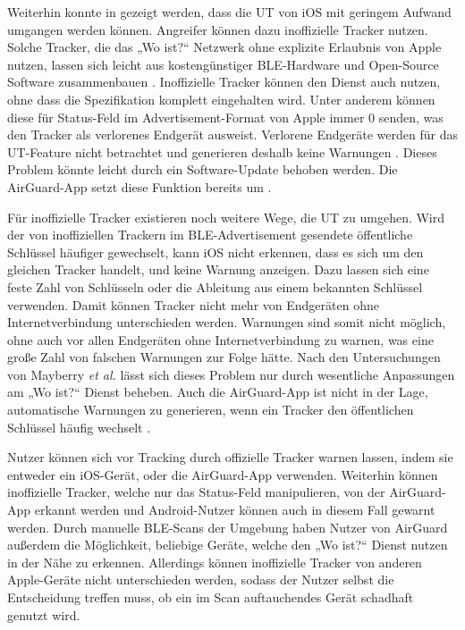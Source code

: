 Weiterhin konnte in \cite{Heinrich_AirGuard,Mayberry_Tracking} gezeigt werden, dass die \ac{UT} von iOS mit geringem Aufwand umgangen werden können.
Angreifer können dazu inoffizielle Tracker nutzen.
Solche Tracker, die das „Wo ist?“ Netzwerk ohne explizite Erlaubnis von Apple nutzen, lassen sich leicht aus kostengünstiger \ac{BLE}-Hardware und Open-Source Software zusammenbauen \cite{Heinrich_OpenHaystack,Mayberry_Tracking}.
Inoffizielle Tracker können den Dienst auch nutzen, ohne dass die Spezifikation komplett eingehalten wird.
Unter anderem können diese für Status-Feld im Advertisement-Format von Apple immer 0 senden, was den Tracker als verlorenes Endgerät ausweist.
Verlorene Endgeräte werden für das \ac{UT}-Feature nicht betrachtet und generieren deshalb keine Warnungen \cite{Heinrich_AirGuard,Mayberry_Tracking}.
Dieses Problem könnte leicht durch ein Software-Update behoben werden.
Die AirGuard-App setzt diese Funktion bereits um \cite{Heinrich_AirGuard}.

Für inoffizielle Tracker existieren noch weitere Wege, die \ac{UT} zu umgehen.
Wird der von inoffiziellen Trackern im \ac{BLE}-Advertisement gesendete öffentliche Schlüssel häufiger gewechselt, kann iOS nicht erkennen, dass es sich um den gleichen Tracker handelt, und keine Warnung anzeigen.
Dazu lassen sich eine feste Zahl von Schlüsseln oder die Ableitung aus einem bekannten Schlüssel verwenden.
Damit können Tracker nicht mehr von Endgeräten ohne Internetverbindung unterschieden werden.
Warnungen sind somit nicht möglich, ohne auch vor allen Endgeräten ohne Internetverbindung zu warnen, was eine große Zahl von falschen Warnungen zur Folge hätte.
Nach den Untersuchungen von Mayberry \textit{et al.} \cite{Mayberry_Tracking} lässt sich dieses Problem nur durch wesentliche Anpassungen am „Wo ist?“ Dienst beheben.
Auch die AirGuard-App ist nicht in der Lage, automatische Warnungen zu generieren, wenn ein Tracker den öffentlichen Schlüssel häufig wechselt \cite{Heinrich_AirGuard}.

Nutzer können sich vor Tracking durch offizielle Tracker warnen lassen, indem sie entweder ein iOS-Gerät, oder die AirGuard-App verwenden.
Weiterhin können inoffizielle Tracker, welche nur das Status-Feld manipulieren, von der AirGuard-App erkannt werden und Android-Nutzer können auch in diesem Fall gewarnt werden.
Durch manuelle \ac{BLE}-Scans der Umgebung haben Nutzer von AirGuard außerdem die Möglichkeit, beliebige Geräte, welche den „Wo ist?“ Dienst nutzen in der Nähe zu erkennen.
Allerdings können inoffizielle Tracker von anderen Apple-Geräte nicht unterschieden werden, sodass der Nutzer selbst die Entscheidung treffen muss, ob ein im Scan auftauchendes Gerät schadhaft genutzt wird.

